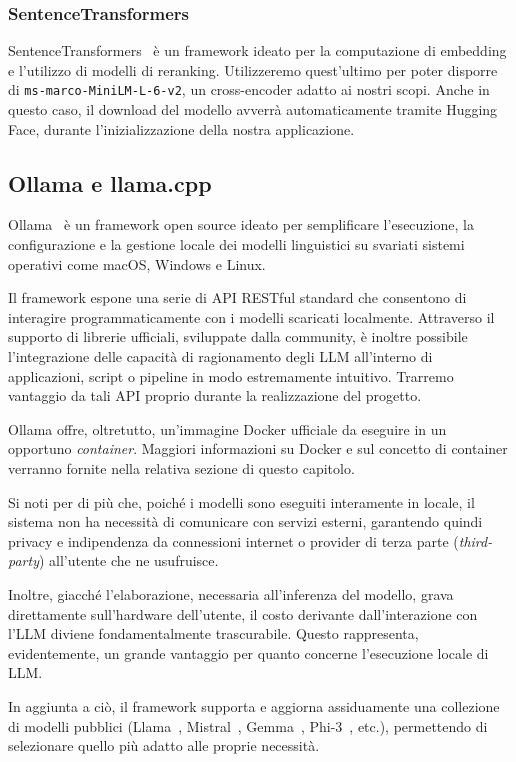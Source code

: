 \subsubsection{SentenceTransformers}
SentenceTransformers~\cite{sentencetransformers_docs} è un framework ideato per la computazione di embedding e l'utilizzo di modelli di reranking. Utilizzeremo quest'ultimo per poter disporre di \texttt{ms-marco-MiniLM-L-6-v2}, un cross-encoder adatto ai nostri scopi. Anche in questo caso, il download del modello avverrà automaticamente tramite Hugging Face, durante l'inizializzazione della nostra applicazione.


\subsection{Ollama e llama.cpp}
Ollama~\cite{ollama_docs} è un framework open source ideato per semplificare l'esecuzione, la configurazione e la gestione locale dei modelli linguistici su svariati sistemi operativi come macOS, Windows e Linux.

Il framework espone una serie di API RESTful standard che consentono di interagire programmaticamente con i modelli scaricati localmente. Attraverso il supporto di librerie ufficiali, sviluppate dalla community, è inoltre possibile l'integrazione delle capacità di ragionamento degli LLM all'interno di applicazioni, script o pipeline in modo estremamente intuitivo. Trarremo vantaggio da tali API proprio durante la realizzazione del progetto.  

Ollama offre, oltretutto, un'immagine Docker ufficiale da eseguire in un opportuno \textit{container}. Maggiori informazioni su Docker e sul concetto di container verranno fornite nella relativa sezione di questo capitolo.

Si noti per di più che, poiché i modelli sono eseguiti interamente in locale, il sistema non ha necessità di comunicare con servizi esterni, garantendo quindi privacy e indipendenza da connessioni internet o provider di terza parte (\textit{third-party}) all'utente che ne usufruisce.

Inoltre, giacché l'elaborazione, necessaria all'inferenza del modello, grava direttamente sull'hardware dell'utente, il costo derivante dall'interazione con l'LLM diviene fondamentalmente trascurabile. Questo rappresenta, evidentemente, un grande vantaggio per quanto concerne l'esecuzione locale di LLM.

In aggiunta a ciò, il framework supporta e aggiorna assiduamente una collezione di modelli pubblici (Llama~\cite{llamaai_docs}, Mistral~\cite{mistralai_docs}, Gemma~\cite{gemmaai_docs}, Phi-3~\cite{phi3ai_docs}, etc.), permettendo di selezionare quello più adatto alle proprie necessità.

